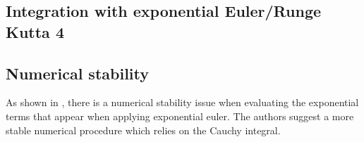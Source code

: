 \documentclass[a4paper,12pt]{extarticle}
\begin{document}
\subsection{Integration with exponential Euler/Runge Kutta 4}

\subsection{Numerical stability}

As shown in \cite{Kassam2005}, there is a numerical stability issue when evaluating the exponential terms that appear when applying exponential euler. The authors suggest a more stable numerical procedure which relies on the Cauchy integral.



\end{document}
